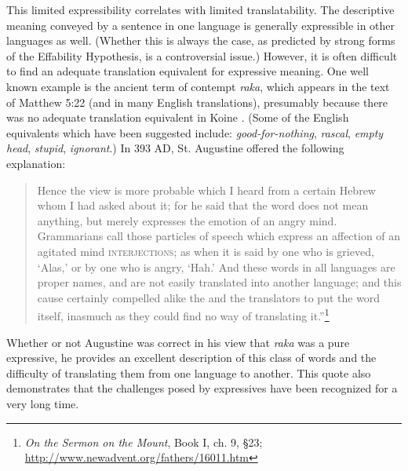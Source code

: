 This limited expressibility correlates with limited translatability. The descriptive meaning conveyed by a sentence in one language is generally expressible in other languages as well. (Whether this is always the case, as predicted by strong forms of the Effability Hypothesis, is a controversial issue.) However, it is often difficult to find an adequate translation equivalent for expressive meaning. One well known example is the ancient  term of contempt \textit{raka}, which appears in the  text of Matthew 5:22 (and in many English translations), presumably because there was no adequate translation equivalent in Koine . (Some of the English equivalents which have been suggested include: \textit{good-for-nothing}, \textit{rascal}, \textit{empty head}, \textit{stupid}, \textit{ignorant}.) In 393 AD, St. Augustine offered the following explanation:


\begin{quote}
Hence the view is more probable which I heard from a certain Hebrew whom I had asked about it; for he said that the word does not mean anything, but merely expresses the emotion of an angry mind. Grammarians call those particles of speech which express an affection of an agitated mind \textsc{interjections}; as when it is said by one who is grieved, ‘Alas,’ or by one who is angry, ‘Hah.’ And these words in all languages are proper names, and are not easily translated into another language; and this cause certainly compelled alike the  and the  translators to put the word itself, inasmuch as they could find no way of translating it.”\footnote{\textit{On the Sermon on the Mount}, Book I, ch. 9, §23; \url{http://www.newadvent.org/fathers/16011.htm}} 
\end{quote}


Whether or not Augustine was correct in his view that \textit{raka} was a pure expressive, he provides an excellent description of this class of words and the difficulty of translating them from one language to another. This quote also demonstrates that the challenges posed by expressives have been recognized for a very long time.




